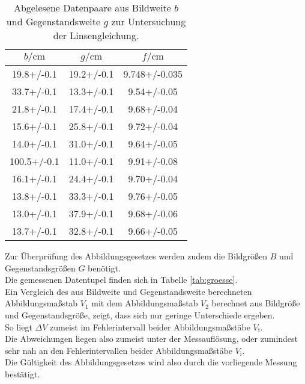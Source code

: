 \begin{table}
  \caption{Abgelesene Datenpaare aus Bildweite $b$ und Gegenstandsweite $g$ zur Untersuchung der Linsengleichung.}
  \label{tab:bundg}
  \centering
  \begin{tabular}{ccc}
    \toprule
  $b/\si{\centi\meter}$ & $g/\si{\centi\meter}$ & $f/\si{\centi\meter}$ \\
\midrule
  19.8+/-0.1 & 19.2+/-0.1 & 9.748+/-0.035 \\
  33.7+/-0.1 & 13.3+/-0.1 & 9.54+/-0.05 \\
  21.8+/-0.1 & 17.4+/-0.1 & 9.68+/-0.04 \\
  15.6+/-0.1 & 25.8+/-0.1 & 9.72+/-0.04 \\
  14.0+/-0.1 & 31.0+/-0.1 & 9.64+/-0.05 \\
  100.5+/-0.1 & 11.0+/-0.1 & 9.91+/-0.08 \\
  16.1+/-0.1 & 24.4+/-0.1 & 9.70+/-0.04 \\
  13.8+/-0.1 & 33.3+/-0.1 & 9.76+/-0.05 \\
  13.0+/-0.1 & 37.9+/-0.1 & 9.68+/-0.06 \\
  13.7+/-0.1 & 32.8+/-0.1 & 9.66+/-0.05 \\
\bottomrule
\end{tabular}
\end{table}
Zur Überprüfung des Abbildungsgesetzes werden zudem die Bildgrößen $B$ und Gegenstandsgrößen $G$ benötigt. \\Die gemessenen Datentupel finden sich in Tabelle \ref{tab:groesse}. \\
Ein Vergleich des aus  Bildweite und Gegenstandsweite berechneten Abbildungsmaßstab $V_\mathrm{1}$ mit dem Abbildungsmaßstab $V_\mathrm{2}$ berechnet aus Bildgröße und Gegenstandsgröße, zeigt, dass sich nur geringe Unterschiede ergeben.\\ So liegt $\Delta V$ zumeist im Fehlerintervall beider Abbildungsmaßstäbe $V_\mathrm{i}$.\\
Die Abweichungen liegen also zumeist unter der Messauflösung, oder zumindest sehr nah an den Fehlerintervallen beider Abbildungsmaßstäbe $V_\mathrm{i}$.
\\Die Gültigkeit des Abbildungsgesetzes wird also durch die vorliegende Messung bestätigt.
